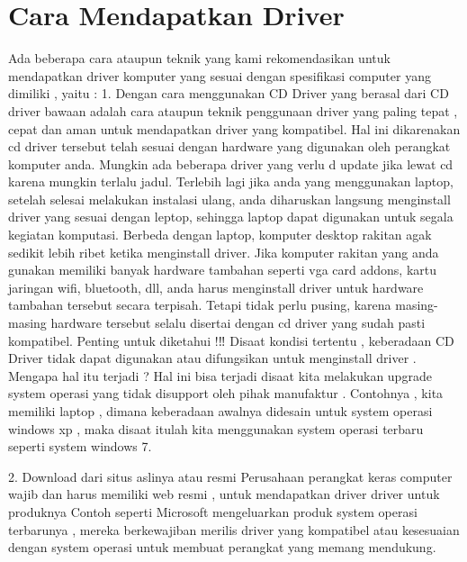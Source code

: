 \section{Cara Mendapatkan Driver}
Ada beberapa cara ataupun teknik yang kami rekomendasikan untuk mendapatkan driver komputer yang sesuai dengan spesifikasi computer yang dimiliki , yaitu :
1.	Dengan cara menggunakan CD 
Driver yang berasal dari CD driver bawaan adalah cara ataupun teknik penggunaan driver yang paling tepat , cepat dan aman untuk mendapatkan driver yang kompatibel.
Hal ini dikarenakan cd driver tersebut telah sesuai dengan hardware yang digunakan oleh perangkat komputer anda. 
Mungkin ada beberapa driver yang verlu d update jika lewat cd karena mungkin terlalu jadul.
Terlebih lagi jika anda yang menggunakan laptop, setelah selesai melakukan instalasi ulang, anda diharuskan langsung menginstall driver yang sesuai dengan leptop, sehingga laptop dapat digunakan untuk segala kegiatan komputasi.
Berbeda dengan laptop, komputer desktop rakitan agak sedikit lebih ribet ketika menginstall driver.
Jika komputer rakitan yang anda gunakan memiliki banyak hardware tambahan seperti vga card addons, kartu jaringan wifi, bluetooth, dll, anda harus menginstall driver untuk hardware tambahan tersebut secara terpisah.
Tetapi tidak perlu pusing, karena masing-masing hardware tersebut selalu disertai dengan cd driver yang sudah pasti kompatibel.
Penting untuk diketahui !‼
Disaat kondisi tertentu  , keberadaan CD Driver tidak dapat digunakan atau difungsikan untuk menginstall driver . Mengapa hal itu terjadi ? Hal ini bisa terjadi disaat kita melakukan upgrade system operasi yang tidak disupport oleh pihak manufaktur . Contohnya , kita memiliki laptop , dimana keberadaan awalnya didesain untuk system operasi windows xp , maka disaat itulah kita menggunakan system operasi terbaru seperti system windows 7.

2. Download dari situs aslinya atau resmi
Perusahaan perangkat keras computer wajib dan harus memiliki web resmi , untuk mendapatkan driver driver untuk produknya
Contoh seperti Microsoft mengeluarkan produk system operasi terbarunya , mereka berkewajiban merilis driver yang kompatibel atau kesesuaian dengan system operasi untuk membuat perangkat yang memang mendukung.

